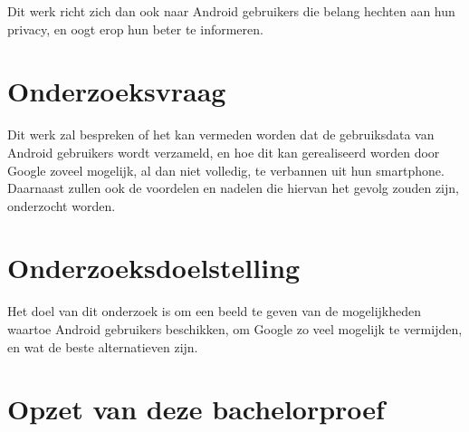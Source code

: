 Dit werk richt zich dan ook naar Android gebruikers die belang hechten aan hun privacy, en oogt erop hun beter te informeren.


\section{Onderzoeksvraag}
\label{sec:onderzoeksvraag}

Dit werk zal bespreken of het kan vermeden worden dat de gebruiksdata van Android gebruikers wordt verzameld, en hoe dit kan gerealiseerd worden door Google zoveel mogelijk, al dan niet volledig, te verbannen uit hun smartphone. Daarnaast zullen ook de voordelen en nadelen die hiervan het gevolg zouden zijn, onderzocht worden.

\section{Onderzoeksdoelstelling}
\label{sec:onderzoeksdoelstelling}

Het doel van dit onderzoek is om een beeld te geven van de mogelijkheden waartoe Android gebruikers beschikken, om Google zo veel mogelijk te vermijden, en wat de beste alternatieven zijn.

\section{Opzet van deze bachelorproef}
\label{sec:opzet-bachelorproef}

